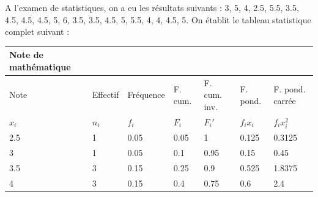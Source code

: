 \newpage

\begin{landscape}
\begin{exemple}
A l'examen de statistiques, on a eu les résultats suivants : 3, 5, 4, 2.5, 5.5, 3.5, 4.5, 4.5, 4.5, 5, 6, 3.5, 3.5, 4.5, 5, 5.5, 4, 4, 4.5, 5. On établit le tableau statistique complet suivant :

\vspace{5mm}

\begin{tabular}{|l|llllll}
\cline{1-1}
Note de mathématique &                               &                                &                                        &                                            &                                         &                                                 \\ \hline
Note                 & \multicolumn{1}{l|}{Effectif} & \multicolumn{1}{l|}{Fréquence} & \multicolumn{1}{l|}{F. cum.} & \multicolumn{1}{l|}{F. cum. inv.} & \multicolumn{1}{l|}{F. pond.} & \multicolumn{1}{l|}{F. pond. carrée}     \\ \hline
$x_i$                 & \multicolumn{1}{l|}{$n_i$}     & \multicolumn{1}{l|}{$f_i$}      & \multicolumn{1}{l|}{$F_i$}              & \multicolumn{1}{l|}{$F_i'$}                 & \multicolumn{1}{l|}{$f_i x_i$}           & \multicolumn{1}{l|}{$f_i x_i^2$} \\ \hline
2.5                  & \multicolumn{1}{l|}{1}        & \multicolumn{1}{l|}{0.05}      & \multicolumn{1}{l|}{0.05}              & \multicolumn{1}{l|}{1}                     & \multicolumn{1}{l|}{0.125}              & \multicolumn{1}{l|}{0.3125}                     \\ \hline
3                    & \multicolumn{1}{l|}{1}        & \multicolumn{1}{l|}{0.05}      & \multicolumn{1}{l|}{0.1}               & \multicolumn{1}{l|}{0.95}                  & \multicolumn{1}{l|}{0.15}               & \multicolumn{1}{l|}{0.45}                       \\ \hline
3.5                  & \multicolumn{1}{l|}{3}        & \multicolumn{1}{l|}{0.15}      & \multicolumn{1}{l|}{0.25}              & \multicolumn{1}{l|}{0.9}                   & \multicolumn{1}{l|}{0.525}              & \multicolumn{1}{l|}{1.8375}                     \\ \hline
4                    & \multicolumn{1}{l|}{3}        & \multicolumn{1}{l|}{0.15}      & \multicolumn{1}{l|}{0.4}               & \multicolumn{1}{l|}{0.75}                  & \multicolumn{1}{l|}{0.6}                & \multicolumn{1}{l|}{2.4}                        \\ \hline

\end{tabular}
\end{exemple}
\end{landscape}
